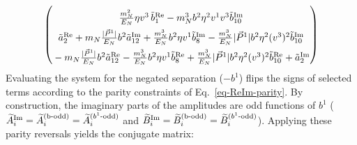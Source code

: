 \begin{align}
\begin{pmatrix}
      \rule{0pt}{16pt} \frac{\mN^2}{E_N} \eta v^3\, \tilde b^{\text{Re}}_1 -\mN^3 \bvec^2 \eta^2 v^1 v^3\tilde b^{\text{Im}}_{10}\\
      \rule{0pt}{16pt}  \tilde a^{\text{Re}}_2 +  \mN  \frac{|\vec{P}^1|}{E_N} \bvec^2  \tilde a^{\text{Im}}_{12}+ \frac{  \mN^3}{E_N}  \bvec^2 \eta v^1  \tilde b^{\text{Im}}_8- \frac{ \mN^3}{E_N}  |\vec{P}^1| \bvec^2 \eta^2 (v^3)^2 \tilde b^{\text{Im}}_{10}\\
      \rule{0pt}{16pt} -  \mN  \frac{|\vec{P}^1|}{E_N} \bvec^2  \tilde a^{\text{Re}}_{12}- \frac{  \mN^3}{E_N}  \bvec^2 \eta v^1  \tilde b^{\text{Re}}_8+ \frac{ \mN^3}{E_N}  |\vec{P}^1| \bvec^2 \eta^2 (v^3)^2 \tilde b^{\text{Re}}_{10}+\tilde a^{\text{Im}}_2
    \end{pmatrix}
\end{align}
Evaluating the system for the negated separation ($-b^1$) flips the signs of selected terms according to the parity constraints of Eq.~\eqref{eq-ReIm-parity}. By construction, the imaginary parts of the amplitudes are odd functions of $b^1$ ($\widetilde{A}_i^{\text{Im}}=\widetilde{A}_i^{\text{(b-odd)}}=\widetilde{A}_i^{\text{($b^1$-odd)}}$ and  $\widetilde{B}_i^{\text{Im}}=\widetilde{B}_i^{\text{(b-odd)}}=\widetilde{B}_i^{\text{($b^1$-odd)}}$). Applying these parity reversals yields the conjugate matrix:
